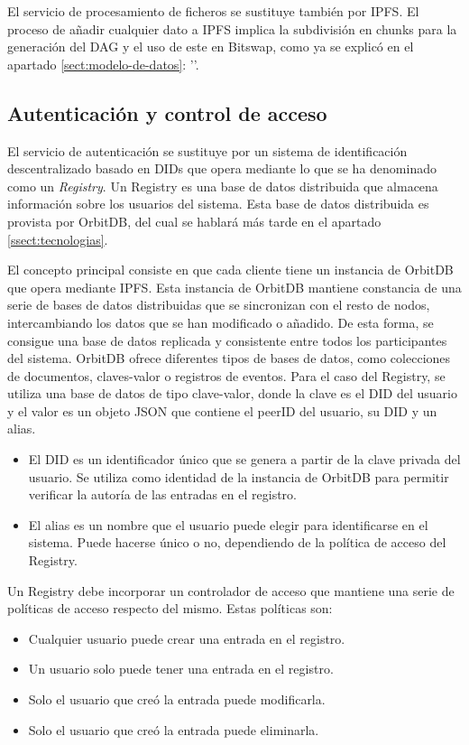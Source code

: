 El servicio de procesamiento de ficheros se sustituye también por IPFS. El proceso de añadir cualquier dato a IPFS implica la subdivisión en chunks
para la generación del DAG y el uso de este en Bitswap, como ya se explicó en el apartado \ref{sect:modelo-de-datos}: ''.

\subsection{Autenticación y control de acceso}\label{ssect:autenticacion}
El servicio de autenticación se sustituye por un sistema de identificación descentralizado basado en DIDs que opera mediante
lo que se ha denominado como un \textit{Registry}. Un Registry es una base de datos distribuida que almacena información sobre los usuarios del sistema.
Esta base de datos distribuida es provista por OrbitDB, del cual se hablará más tarde en el apartado \ref{ssect:tecnologias}.

El concepto principal consiste
en que cada cliente tiene un instancia de OrbitDB que opera mediante IPFS. Esta instancia de OrbitDB mantiene constancia de una serie de bases de datos distribuidas que se sincronizan
con el resto de nodos, intercambiando los datos que se han modificado o añadido. De esta forma, se consigue una base de datos replicada y consistente entre todos los participantes del
sistema. OrbitDB ofrece diferentes tipos de bases de datos, como colecciones de documentos, claves-valor o registros de eventos. Para el caso del Registry, se utiliza una base de
datos de tipo clave-valor, donde la clave es el DID del usuario y el valor es un objeto JSON que contiene el peerID del usuario, su DID y un alias.
\begin{itemize}[noitemsep,after=\vspace{-0.4\baselineskip}]
  \item El DID es un identificador único que se genera a partir de la clave privada del usuario.
        Se utiliza como identidad de la instancia de OrbitDB para permitir verificar la autoría de las entradas en el registro.
  \item El alias es un nombre que el usuario puede elegir para identificarse en el sistema. Puede hacerse único o no, dependiendo de la política de acceso del Registry.
\end{itemize}

Un Registry debe incorporar un controlador de acceso que mantiene una serie de políticas de acceso respecto del mismo.
Estas políticas son:
\begin{itemize}[noitemsep,after=\vspace{-0.4\baselineskip}]
  \item Cualquier usuario puede crear una entrada en el registro.
  \item Un usuario solo puede tener una entrada en el registro.
  \item Solo el usuario que creó la entrada puede modificarla.
  \item Solo el usuario que creó la entrada puede eliminarla.
\end{itemize}


